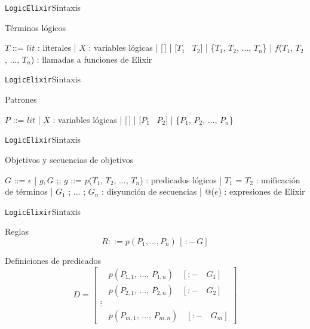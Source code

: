 \documentclass[14pt,aspectratio=169]{beamer}
\begin{document}
\begin{frame}{\texttt{LogicElixir}}{Sintaxis}
  \footnotesize \begin{block}{Términos lógicos}
    \begin{bnfgrammar}
      $T$ ::= $lit$ : literales
        | $X$ : variables lógicas
        | [\,]
        | [$T_1$ \textbar\ $T_2$]
        | \{$T_1$, $T_2$, ..., $T_n$\}
        | $f$($T_1$, $T_2$, ..., $T_n$) : llamadas a funciones de Elixir
    \end{bnfgrammar}
  \end{block}
\end{frame}

\begin{frame}{\texttt{LogicElixir}}{Sintaxis}
  \begin{block}{Patrones}
    \begin{bnfgrammar}
      $P$ ::= $lit$
      | $X$ : variables lógicas
      | [\,]
      | [$P_1$ \textbar\ $P_2$]
      | \{$P_1$, $P_2$, ..., $P_n$\}
    \end{bnfgrammar}
  \end{block}
\end{frame}

\begin{frame}{\texttt{LogicElixir}}{Sintaxis}
  \footnotesize \begin{block}{Objetivos y secuencias de objetivos}
    \begin{bnfgrammar}
      $G$ ::= $\epsilon$ | $g, G$
    ;;
      $g$ ::= $p$($T_1$, $T_2$, ..., $T_n$) : predicados lógicos
          | $T_1$ = $T_2$ : unificación de términos
          | $G_1$ ; ... ; $G_n$ : disyunción de secuencias
          | $@$($e$) : expresiones de Elixir
    \end{bnfgrammar}
  \end{block}
\end{frame}

\begin{frame}{\texttt{LogicElixir}}{Sintaxis}
  \begin{block}{Reglas}
    \begin{equation*}
      R ::= p(P_1, ..., P_n)\,[\,:-\, G]
    \end{equation*}
  \end{block}
  \begin{block}{Definiciones de predicados}
    \begin{equation*}
      D =
      \begin{bmatrix}
        \quad p(P_{1,1},\, \ldots,\, P_{1,n}) \quad [:- \quad G_1]\\
        \quad p(P_{2,1},\, \ldots,\, P_{2,n}) \quad [:- \quad G_2]\\
        \vdots \\
        \quad p(P_{m,1},\, \ldots,\, P_{m,n}) \quad [:- \quad G_m]
      \end{bmatrix}
    \end{equation*}
  \end{block}
\end{frame}
\end{document}
